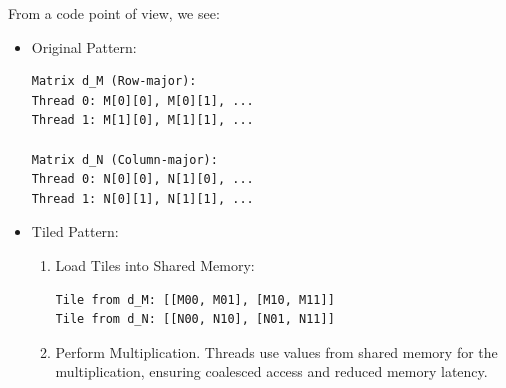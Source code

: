 \highspace
From a code point of view, we see:
\begin{itemize}
    \item Original Pattern:
    \begin{lstlisting}
Matrix d_M (Row-major):
Thread 0: M[0][0], M[0][1], ...
Thread 1: M[1][0], M[1][1], ...

Matrix d_N (Column-major):
Thread 0: N[0][0], N[1][0], ...
Thread 1: N[0][1], N[1][1], ...\end{lstlisting}

    \item Tiled Pattern:
    \begin{enumerate}
        \item Load Tiles into Shared Memory:
        \begin{lstlisting}
Tile from d_M: [[M00, M01], [M10, M11]]
Tile from d_N: [[N00, N10], [N01, N11]]\end{lstlisting}

        \item Perform Multiplication. Threads use values from shared memory for the multiplication, ensuring coalesced access and reduced memory latency.
    \end{enumerate}
\end{itemize}

